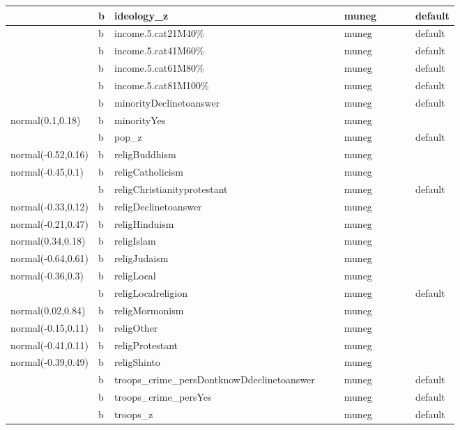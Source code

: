 \documentclass[
]{book}
\theoremstyle{definition}
\theoremstyle{definition}
\theoremstyle{definition}
\theoremstyle{definition}
\theoremstyle{remark}
\begin{document}
\begin{table}
\begin{tabular}[t]{l|l|l|l|l|l|l|l|l|l}
\hline
 & b & ideology\_z &  &  & muneg &  &  &  & default\\
\hline
 & b & income.5.cat21M40\% &  &  & muneg &  &  &  & default\\
\hline
 & b & income.5.cat41M60\% &  &  & muneg &  &  &  & default\\
\hline
 & b & income.5.cat61M80\% &  &  & muneg &  &  &  & default\\
\hline
 & b & income.5.cat81M100\% &  &  & muneg &  &  &  & default\\
\hline
 & b & minorityDeclinetoanswer &  &  & muneg &  &  &  & default\\
\hline
normal(0.1,0.18) & b & minorityYes &  &  & muneg &  &  &  & \\
\hline
 & b & pop\_z &  &  & muneg &  &  &  & default\\
\hline
normal(-0.52,0.16) & b & religBuddhism &  &  & muneg &  &  &  & \\
\hline
normal(-0.45,0.1) & b & religCatholicism &  &  & muneg &  &  &  & \\
\hline
 & b & religChristianityprotestant &  &  & muneg &  &  &  & default\\
\hline
normal(-0.33,0.12) & b & religDeclinetoanswer &  &  & muneg &  &  &  & \\
\hline
normal(-0.21,0.47) & b & religHinduism &  &  & muneg &  &  &  & \\
\hline
normal(0.34,0.18) & b & religIslam &  &  & muneg &  &  &  & \\
\hline
normal(-0.64,0.61) & b & religJudaism &  &  & muneg &  &  &  & \\
\hline
normal(-0.36,0.3) & b & religLocal &  &  & muneg &  &  &  & \\
\hline
 & b & religLocalreligion &  &  & muneg &  &  &  & default\\
\hline
normal(0.02,0.84) & b & religMormonism &  &  & muneg &  &  &  & \\
\hline
normal(-0.15,0.11) & b & religOther &  &  & muneg &  &  &  & \\
\hline
normal(-0.41,0.11) & b & religProtestant &  &  & muneg &  &  &  & \\
\hline
normal(-0.39,0.49) & b & religShinto &  &  & muneg &  &  &  & \\
\hline
 & b & troops\_crime\_persDontknowDdeclinetoanswer &  &  & muneg &  &  &  & default\\
\hline
 & b & troops\_crime\_persYes &  &  & muneg &  &  &  & default\\
\hline
 & b & troops\_z &  &  & muneg &  &  &  & default\\

\end{tabular}
\end{table}
\end{document}
